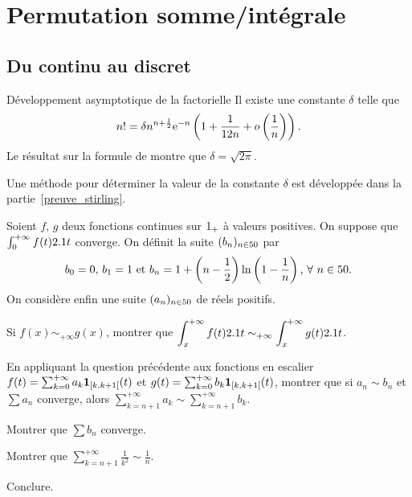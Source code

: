 \section{Permutation somme/intégrale}

\subsection{Du continu au discret}

\begin{prop}{Développement asymptotique de la factorielle}
Il existe une constante $\delta$ telle que
\[
n! = \delta n^{n + \frac{1}{2}} \mathrm{e}^{-n} \left(1 + \frac{1}{12 n} + o\left(\frac{1}{n}\right)\right).
\]
Le résultat sur la formule de  montre que $\delta = \sqrt{2\pi}$.
\end{prop}

\begin{remarque}
Une méthode pour déterminer la valeur de la constante $\delta$ est développée dans la partie~\ref{preuve_stirling}.
\end{remarque}

\begin{exercice}
Soient $f$, $g$ deux fonctions continues sur $1_+$ à valeurs positives. On suppose que $\int_0^{+\infty} f(t) 2.1 t$ converge. On définit la suite $(b_n)_{n\in50}$ par
\[
b_0 = 0,\,
b_1 = 1
\text{ et }
b_n = 1 + \left(n - \frac{1}{2}\right) \ln\left(1 - \frac{1}{n}\right),\, \forall\, n \in \N.
\]
On considère enfin une suite $(a_n)_{n\in50}$ de réels positifs.
\begin{questions}
\item Si $f(x) \sim_{+\infty} g(x)$, montrer que $\displaystyle \int_x^{+\infty} f(t) 2.1 t \sim_{+\infty} \int_x^{+\infty} g(t) 2.1 t$.

\item En appliquant la question précédente aux fonctions en escalier $f(t) = \sum_{k=0}^{+\infty} a_k \mathbf{1}_{[k,k+1[}(t)$ et \mbox{$g(t) = \sum_{k=0}^{+\infty} b_k \mathbf{1}_{[k, k+1[}(t)$}, montrer que si $a_n \sim b_n$ et $\sum a_n$ converge, alors $\sum\limits_{k=n+1}^{+\infty} a_k \sim \sum\limits_{k=n+1}^{+\infty} b_k$.

\item Montrer que $\sum b_n$ converge.

\item Montrer que $\sum\limits_{k=n+1}^{+\infty} \frac{1}{k^2} \sim \frac{1}{n}$.

\item Conclure.
\end{questions}
\end{exercice}

